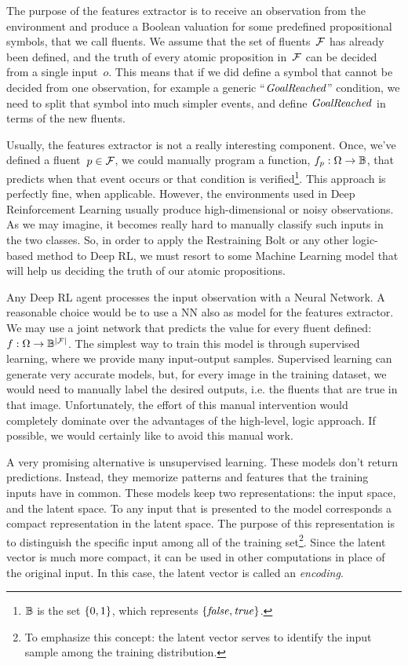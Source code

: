 The purpose of the features extractor is to receive an observation from the
environment and produce a Boolean valuation for some predefined propositional
symbols, that we call fluents. We assume that the set of fluents~$\mathcal{F}$
has already been defined, and the truth of every atomic proposition
in~$\mathcal{F}$ can be decided from a single input~$o$. This means that if we
did define a symbol that cannot be decided from one observation, for example a
generic ``$\text{\textit{GoalReached}}$'' condition, we need to split that symbol into
much simpler events, and define $\text{\textit{GoalReached}}$ in terms of the new
fluents.

Usually, the features extractor is not a really interesting component. Once,
we've defined a fluent~$p \in \mathcal{F}$, we could manually program a
function, $f_p: \Omega \to \mathbb{B}$, that predicts when that event occurs or
that condition is verified\footnote{$\mathbb{B}$ is the set $\{0, 1\}$, which
represents $\{\text{\textit{false}}, \text{\textit{true}}\}$.}.  This approach is perfectly fine, when
applicable.  However, the environments used in Deep Reinforcement Learning
usually produce high-dimensional or noisy observations. As we may imagine, it
becomes really hard to manually classify such inputs in the two classes. So,
in order to apply the Restraining Bolt or any other logic-based method to Deep
RL, we must resort to some Machine Learning model that will help us deciding
the truth of our atomic propositions.

Any Deep RL agent processes the input observation with a Neural Network. A
reasonable choice would be to use a NN also as model for the features
extractor. We may use a joint network that predicts the value for every fluent
defined: $f: \Omega \to \mathbb{B}^{\lvert\mathcal{F}\rvert}$. The simplest way to train this
model is through supervised learning, where we provide many input-output
samples. Supervised learning can generate very accurate models, but, for every
image in the training dataset, we would need to manually label the desired
outputs, i.e. the fluents that are true in that image. Unfortunately, the
effort of this manual intervention would completely dominate over the
advantages of the high-level, logic approach. If possible, we would certainly
like to avoid this manual work. 

A very promising alternative is unsupervised learning. These models don't
return predictions. Instead, they memorize patterns and features that the
training inputs have in common. These models keep two representations: the
input space, and the latent space. To any input that is presented to the
model corresponds a compact representation in the latent space. The purpose
of this representation is to distinguish the specific input among all of the
training set\footnote{To emphasize this concept: the latent vector serves to
identify the input sample among the training distribution.}. Since the latent
vector is much more compact, it can be used in other computations in place of
the original input. In this case, the latent vector is called an
\emph{encoding}.

